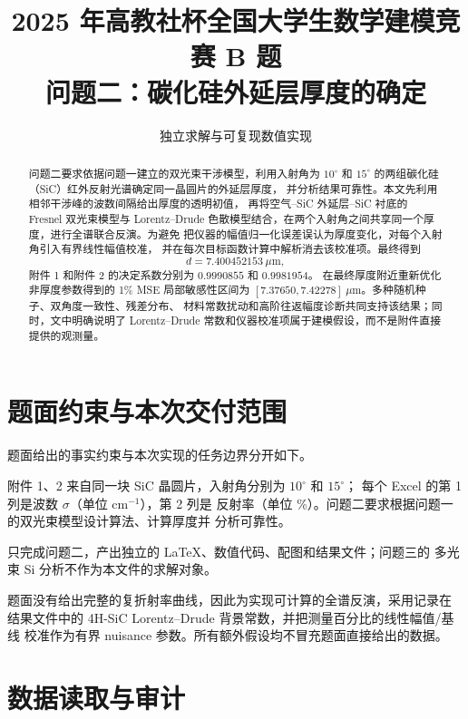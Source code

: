 \documentclass[UTF8,12pt,a4paper]{ctexart}
\title{2025 年高教社杯全国大学生数学建模竞赛 B 题\\[0.4em]
问题二：碳化硅外延层厚度的确定}
\author{独立求解与可复现数值实现}
\date{}
\begin{document}
\maketitle

\begin{abstract}
问题二要求依据问题一建立的双光束干涉模型，利用入射角为 $10^\circ$ 和
$15^\circ$ 的两组碳化硅（SiC）红外反射光谱确定同一晶圆片的外延层厚度，
并分析结果可靠性。本文先利用相邻干涉峰的波数间隔给出厚度的透明初值，
再将空气--SiC 外延层--SiC 衬底的 Fresnel 双光束模型与 Lorentz--Drude
色散模型结合，在两个入射角之间共享同一个厚度，进行全谱联合反演。为避免
把仪器的幅值归一化误差误认为厚度变化，对每个入射角引入有界线性幅值校准，
并在每次目标函数计算中解析消去该校准项。最终得到
\[
\boxed{d=7.400452153\ \mu\mathrm{m}},
\]
附件 1 和附件 2 的决定系数分别为 $0.9990855$ 和 $0.9981954$。
在最终厚度附近重新优化非厚度参数得到的 1\% MSE 局部敏感性区间为
$[7.37650,7.42278]\ \mu\mathrm{m}$。多种随机种子、双角度一致性、残差分布、
材料常数扰动和高阶往返幅度诊断共同支持该结果；同时，文中明确说明了
Lorentz--Drude 常数和仪器校准项属于建模假设，而不是附件直接提供的观测量。
\end{abstract}

\section{题面约束与本次交付范围}

题面给出的事实约束与本次实现的任务边界分开如下。

\begin{description}[leftmargin=5em]
  \item[题面事实]
  附件 1、2 来自同一块 SiC 晶圆片，入射角分别为 $10^\circ$ 和 $15^\circ$；
  每个 Excel 的第 1 列是波数 $\sigma$（单位 $\mathrm{cm}^{-1}$），第 2 列是
  反射率（单位 \%）。问题二要求根据问题一的双光束模型设计算法、计算厚度并
  分析可靠性。
  \item[本次用户任务]
  只完成问题二，产出独立的 LaTeX、数值代码、配图和结果文件；问题三的
  多光束 Si 分析不作为本文件的求解对象。
  \item[本节采用的额外假设]
  题面没有给出完整的复折射率曲线，因此为实现可计算的全谱反演，采用记录在
  结果文件中的 4H-SiC Lorentz--Drude 背景常数，并把测量百分比的线性幅值/基线
  校准作为有界 nuisance 参数。所有额外假设均不冒充题面直接给出的数据。
\end{description}

\section{数据读取与审计}
\end{document}
